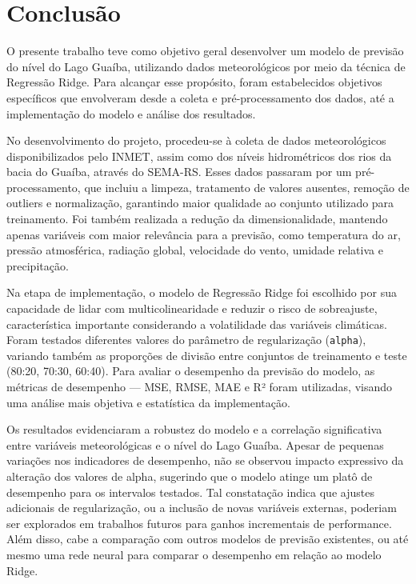 \chapter{Conclusão}
O presente trabalho teve como objetivo geral desenvolver um modelo de previsão do nível do Lago Guaíba, utilizando dados meteorológicos por meio da técnica de Regressão Ridge. Para alcançar esse propósito, foram estabelecidos objetivos específicos que envolveram desde a coleta e pré-processamento dos dados, até a implementação do modelo e análise dos resultados.

No desenvolvimento do projeto, procedeu-se à coleta de dados meteorológicos disponibilizados pelo INMET, assim como dos níveis hidrométricos dos rios da bacia do Guaíba, através do SEMA-RS. Esses dados passaram por um pré-processamento, que incluiu a limpeza, tratamento de valores ausentes, remoção de outliers e normalização, garantindo maior qualidade ao conjunto utilizado para treinamento. Foi também realizada a redução da dimensionalidade, mantendo apenas variáveis com maior relevância para a previsão, como temperatura do ar, pressão atmosférica, radiação global, velocidade do vento, umidade relativa e precipitação.

Na etapa de implementação, o modelo de Regressão Ridge foi escolhido por sua capacidade de lidar com multicolinearidade e reduzir o risco de sobreajuste, característica importante considerando a volatilidade das variáveis climáticas. Foram testados diferentes valores do parâmetro de regularização (\texttt{alpha}), variando também as proporções de divisão entre conjuntos de treinamento e teste (80:20, 70:30, 60:40). Para avaliar o desempenho da previsão do modelo, as métricas de desempenho — MSE, RMSE, MAE e R² foram utilizadas, visando uma análise mais objetiva e estatística da implementação.

Os resultados evidenciaram a robustez do modelo e a correlação significativa entre variáveis meteorológicas e o nível do Lago Guaíba. Apesar de pequenas variações nos indicadores de desempenho, não se observou impacto expressivo da alteração dos valores de alpha, sugerindo que o modelo atinge um platô de desempenho para os intervalos testados. Tal constatação indica que ajustes adicionais de regularização, ou a inclusão de novas variáveis externas, poderiam ser explorados em trabalhos futuros para ganhos incrementais de performance. Além disso, cabe a comparação com outros modelos de previsão existentes, ou até mesmo uma rede neural para comparar o desempenho em relação ao modelo Ridge.

